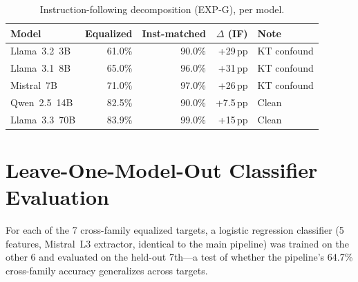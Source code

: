 \begin{table}[h]
\centering
\caption{Instruction-following decomposition (EXP-G), per model.}
\label{tab:expg_summary}
\begin{tabular}{lrrrl}
\toprule
\textbf{Model} & \textbf{Equalized} & \textbf{Inst-matched} & \textbf{$\Delta$ (IF)} & \textbf{Note} \\
\midrule
Llama~3.2~3B  & 61.0\% & 90.0\% & +29\,pp & KT confound \\
Llama~3.1~8B  & 65.0\% & 96.0\% & +31\,pp & KT confound \\
Mistral~7B    & 71.0\% & 97.0\% & +26\,pp & KT confound \\
Qwen~2.5~14B  & 82.5\% & 90.0\% & +7.5\,pp & Clean \\
Llama~3.3~70B & 83.9\% & 99.0\% & +15\,pp & Clean \\
\bottomrule
\end{tabular}
\end{table}

\section{Leave-One-Model-Out Classifier Evaluation}\label{app:loo_across_models}

For each of the 7 cross-family equalized targets, a logistic regression classifier (5 features, Mistral~L3 extractor, identical to the main pipeline) was trained on the other 6 and evaluated on the held-out 7th---a test of whether the pipeline's 64.7\% cross-family accuracy generalizes across targets.

